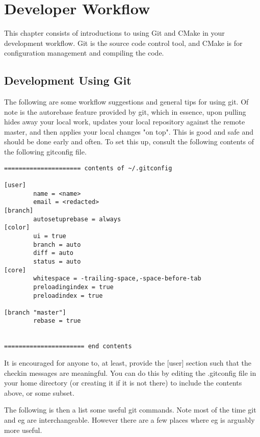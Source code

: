 \documentclass[pdf,12pt,report,strict]{SANDreport}
\theoremstyle{remark}
\begin{document}
\chapter{Developer Workflow}
\label{workflow}

This chapter consists of introductions to using Git and CMake in your
development workflow. Git is the source code control tool, and CMake
is for configuration management and compiling the code. 

\section{Development Using Git}

The following are some workflow suggestions and general tips for using
git. Of note is the autorebase feature provided by git, which in
essence, upon pulling hides away your local work, updates your local
repository against the remote master, and then applies your local
changes "on top". This is good and safe and should be done early and
often. To set this up, consult the following contents of the following
gitconfig file.

\begin{verbatim}
===================== contents of ~/.gitconfig

[user]
        name = <name>
        email = <redacted>
[branch]
        autosetuprebase = always
[color]
        ui = true
        branch = auto
        diff = auto
        status = auto
[core]
        whitespace = -trailing-space,-space-before-tab
        preloadingindex = true
        preloadindex = true

[branch "master"]
        rebase = true


====================== end contents
\end{verbatim}

It is encouraged for anyone to, at least, provide the [user] section
such that the checkin messages are meaningful. You can do this by
editing the .gitconfig file in your home directory (or creating it if
it is not there) to include the contents above, or some subset.

The following is then a list some useful git commands. Note most of
the time git and eg are interchangeable. However there are a few
places where eg is arguably more useful.
\end{document}
